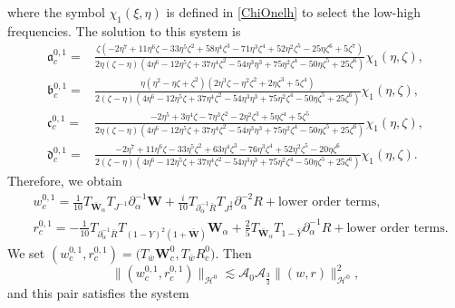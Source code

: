 \documentclass[10pt]{amsart}
\theoremstyle{remark}
\theoremstyle{definition}
\numberwithin{equation}{section}
\newcommand{\p}{\partial}
\renewcommand{\H}{{\mathcal H }}
\newcommand{\al}{\alpha}
\newcommand{\f}{\frac}
\newcommand{\bw}{\mathbf{W}}
\begin{document}
where  the symbol $\chi_{1}(\xi, \eta)$ is defined in \eqref{ChiOnelh} to select the low-high frequencies.
The solution to this system is
\begin{align*}
\mathfrak{a}^{0,1}_{c}=&\f{\zeta(-2\eta^7+11\eta^6\zeta-33\eta^5\zeta^2+58\eta^4\zeta^3-71\eta^3\zeta^4+52\eta^2\zeta^5-25\eta \zeta^6+5\zeta^7)}{2\eta(\zeta-\eta)(4\eta^6-12\eta^5\zeta+37\eta^4\zeta^2-54\eta^3\eta^3+75\eta^2\zeta^4-50\eta\zeta^5+25\zeta^6)}\chi_{1}(\eta,\zeta),\\
\mathfrak{b}^{0,1}_{c}=&\f{\eta(\eta^2-\eta\zeta+\zeta^2)(2\eta^3\zeta-\eta^2\zeta^2+2\eta\zeta^3+5\zeta^4)}{2(\zeta-\eta)(4\eta^6-12\eta^5\zeta+37\eta^4\zeta^2-54\eta^3\eta^3+75\eta^2\zeta^4-50\eta\zeta^5+25\zeta^6)}\chi_{1}(\eta,\zeta),\\
\mathfrak{c}^{0,1}_{c}=&\f{-2\eta^5+3\eta^4\zeta-7\eta^3\zeta^2-2\eta^2\zeta^3+5\eta\zeta^4+5\zeta^5}{2\eta(\zeta-\eta)(4\eta^6-12\eta^5\zeta+37\eta^4\zeta^2-54\eta^3\eta^3+75\eta^2\zeta^4-50\eta\zeta^5+25\zeta^6)}\chi_{1}(\eta,\zeta),\\
\mathfrak{d}^{0,1}_{c}=&\f{-2\eta^7+11\eta^6\zeta-33\eta^5\zeta^2+63\eta^4\zeta^3-76\eta^3\zeta^4+52\eta^2\zeta^5-20\eta \zeta^6}{2(\zeta-\eta)(4\eta^6-12\eta^5\zeta+37\eta^4\zeta^2-54\eta^3\eta^3+75\eta^2\zeta^4-50\eta\zeta^5+25\zeta^6)}\chi_{1}(\eta,\zeta).
\end{align*}
Therefore, we obtain
\begin{align*}
&w^{0,1}_c = \f1{10}T_{\bar{\bw}_{\al}}T_{J^{-1}}\p^{-1}_{\al}\bw+\f{i}{10} T_{\p^{-1}_{\al}\bar{R}}  T_{J^{\frac{3}{2}}}  \p_\al^{-2}R + \text{lower order terms},\\
&r^{0,1}_c = -\f1{10} T_{\p^{-1}_{\al}\bar{R}}T_{(1-Y)^2(1+\bar{\bw})}\bw_{\al}+\f25 T_{\bar{\bw}_{\al}}T_{1-\bar{Y}}  \p^{-1}_{\al}R + \text{lower order terms}.
\end{align*}
We set $(w^{0,1}_c, r^{0,1}_c) = \big(T_{\bar{w}}\bw^0_c, T_{\bar{w}}R^0_c \big)$. Then
\begin{equation*}
\|(w^{0,1}_c, r^{0,1}_c)\|_{\H^0}  \lesssim\mathcal{A}_0 \mathcal{A}_\f32\|(w,r)\|^2_{\H^0},
\end{equation*}
and this pair satisfies the system 
\end{document}
